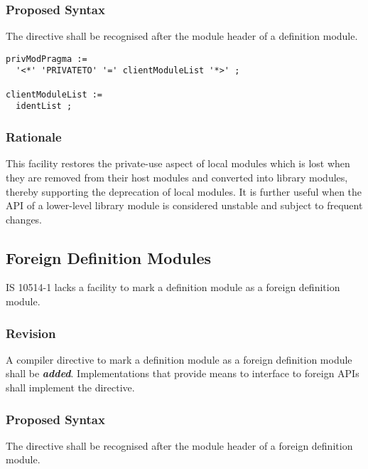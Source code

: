 \documentclass[10pt,a4paper,leqno,fleqn]{article}
\renewcommand{\emph}[1]{\textbf{\textit{#1}}}
\begin{document}
\subsubsection{Proposed Syntax}

The directive shall be recognised after the module header of a
definition module.

\begin{verbatim}
privModPragma :=
  '<*' 'PRIVATETO' '=' clientModuleList '*>' ;
  
clientModuleList :=
  identList ;
\end{verbatim}

\subsubsection{Rationale}

This facility restores the private-use aspect of local modules which is lost when
they are removed from their host modules and converted into library modules,
thereby supporting the deprecation of local modules. It is further useful when the
\gls{API} of a lower-level library module is considered unstable and subject to
frequent changes.


\subsection{Foreign Definition Modules}

IS 10514-1 lacks a facility to mark a definition module as a
\gls{foreign definition module}.

\subsubsection{Revision}

A \gls{compiler directive} to mark a definition module
as a \gls{foreign definition module} shall be \emph{added}.
Implementations that provide means to interface to
\glspl{foreign API} shall implement the directive.

\subsubsection{Proposed Syntax}

The directive shall be recognised after the module header of a
foreign definition module.
\end{document}
